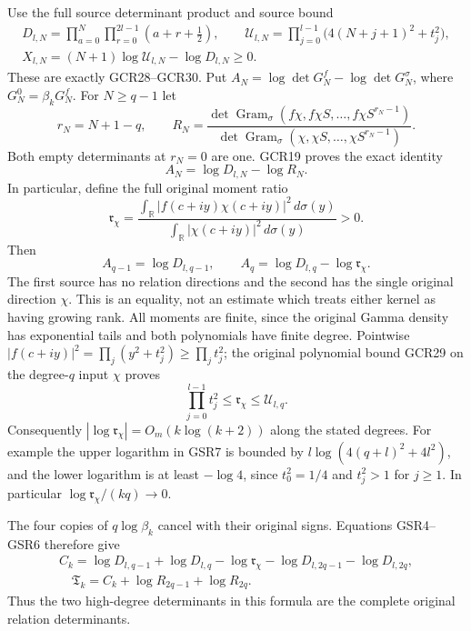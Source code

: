 \documentclass[11pt,a4paper]{article}
\begin{document}
Use the full source determinant product and source bound
\[
\begin{gathered}
 D_{l,N}=\prod_{a=0}^N\prod_{r=0}^{2l-1}(a+r+\tfrac12),\qquad
 \mathscr U_{l,N}=\prod_{j=0}^{l-1}
                         \bigl(4(N+j+1)^2+t_j^2\bigr),\\
 X_{l,N}=(N+1)\log\mathscr U_{l,N}-\log D_{l,N}\geq0.
\end{gathered}\tag{GSR2}
\]
These are exactly GCR28--GCR30. Put
$A_N=\log\det G_N^f-\log\det G_N^\sigma$, where $G_N^0=\beta_kG_N^f$.
For $N\geq q-1$ let
\[
 r_N=N+1-q,\qquad
 R_N=
 \frac{\det\operatorname{Gram}_\sigma
                 (f\chi,f\chi S,\ldots,f\chi S^{r_N-1})}
      {\det\operatorname{Gram}_\sigma
                 (\chi,\chi S,\ldots,\chi S^{r_N-1})}.
\tag{GSR3}
\]
Both empty determinants at $r_N=0$ are one. GCR19 proves
the exact identity
\[
 A_N=\log D_{l,N}-\log R_N.
\tag{GSR4}
\]
In particular, define the full original moment ratio
\[
 \mathfrak r_\chi=
 \frac{\displaystyle\int_{\mathbb R}
              |f(c+iy)\chi(c+iy)|^2\,d\sigma(y)}
      {\displaystyle\int_{\mathbb R}
              |\chi(c+iy)|^2\,d\sigma(y)}>0.
\tag{GSR5}
\]
Then
\[
 A_{q-1}=\log D_{l,q-1},\qquad
 A_q=\log D_{l,q}-\log\mathfrak r_\chi.
\tag{GSR6}
\]
The first source has no relation directions and the second
has the single original direction $\chi$. This is an equality,
not an estimate which treats either kernel as having growing rank.
All moments are finite, since the original Gamma density has
exponential tails and both polynomials have finite degree.
Pointwise $|f(c+iy)|^2=\prod_j(y^2+t_j^2)\geq\prod_jt_j^2$;
the original polynomial bound GCR29 on the degree-$q$ input
$\chi$ proves
\[
 \prod_{j=0}^{l-1}t_j^2\leq\mathfrak r_\chi\leq\mathscr U_{l,q}.
\tag{GSR7}
\]
Consequently $|\log\mathfrak r_\chi|=O_m(k\log(k+2))$ along
the stated degrees. For example the upper logarithm in GSR7
is bounded by
$l\log(4(q+l)^2+4l^2)$, and the lower logarithm is at least
$-\log4$, since $t_0^2=1/4$ and $t_j^2>1$ for $j\geq1$.
In particular $\log\mathfrak r_\chi/(kq)\to0$.

The four copies of $q\log\beta_k$ cancel with their original
signs. Equations GSR4--GSR6 therefore give
\[
\begin{gathered}
 C_k=\log D_{l,q-1}+\log D_{l,q}-\log\mathfrak r_\chi
                     -\log D_{l,2q-1}-\log D_{l,2q},\\
 \boxed{\quad \mathfrak T_k=C_k+\log R_{2q-1}+\log R_{2q}.\quad}
\end{gathered}
\tag{GSR8}
\]
Thus the two high-degree determinants in this formula are the
complete original relation determinants.
\end{document}
